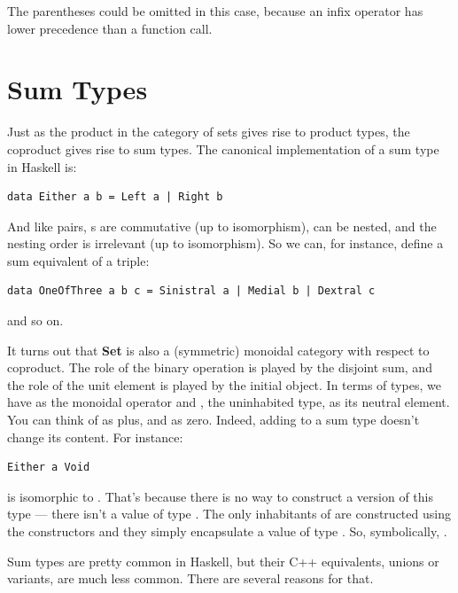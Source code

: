 \noindent
The parentheses could be omitted in this case, because an infix operator
has lower precedence than a function call.

\section{Sum Types}\label{sum-types}

Just as the product in the category of sets gives rise to product types,
the coproduct gives rise to sum types. The canonical implementation of a
sum type in Haskell is:

\begin{verbatim}
data Either a b = Left a | Right b
\end{verbatim}

\noindent
And like pairs, s are commutative (up to isomorphism),
can be nested, and the nesting order is irrelevant (up to isomorphism).
So we can, for instance, define a sum equivalent of a triple:

\begin{verbatim}
data OneOfThree a b c = Sinistral a | Medial b | Dextral c
\end{verbatim}

\noindent
and so on.

It turns out that \textbf{Set} is also a (symmetric) monoidal category
with respect to coproduct. The role of the binary operation is played by
the disjoint sum, and the role of the unit element is played by the
initial object. In terms of types, we have  as the
monoidal operator and , the uninhabited type, as its
neutral element. You can think of  as plus, and
 as zero. Indeed, adding  to a sum type
doesn't change its content. For instance:

\begin{verbatim}
Either a Void
\end{verbatim}

\noindent
is isomorphic to . That's because there is no way to construct
a  version of this type --- there isn't a value of type
. The only inhabitants of  are
constructed using the  constructors and they simply
encapsulate a value of type . So, symbolically,
.

Sum types are pretty common in Haskell, but their C++ equivalents,
unions or variants, are much less common. There are several reasons for
that.

